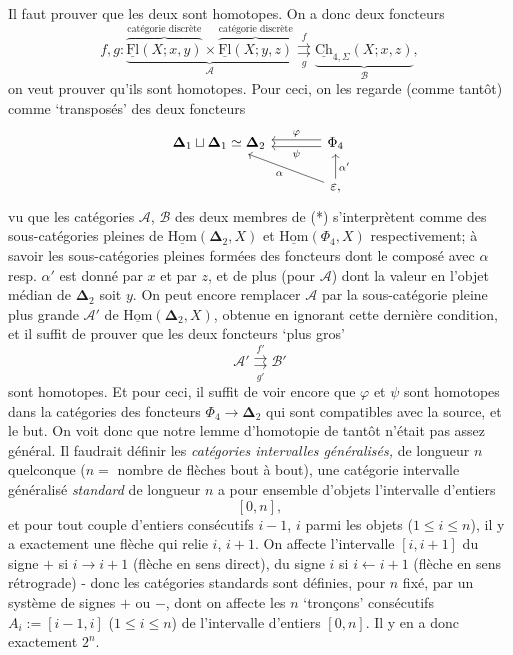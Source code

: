 \documentclass[11pt]{article}
\newcommand{\printedpage}[1]{\marginpar{\footnotesize p.~#1}}
\newcommand{\msp}[1]{\marginpar{\footnotesize [#1]}}
\newcommand{\uHom}{\underline{\mathrm{Hom}}}
\newcommand{\bDelta}{\boldsymbol{\Delta}}
\newcommand{\uCh}{\underline{\mathrm{Ch}}}
\newcommand{\uFl}{\underline{\mathrm{Fl}}}
\begin{document}
\msp{page 24}Il faut prouver que les deux sont homotopes. On a donc deux foncteurs
\[
f,g : \underbrace{\overbrace{\uFl(X;x,y)}^{\text{catégorie discrète}} \times \overbrace{\uFl(X;y,z)}^{\text{catégorie discrète}}}_{\mathcal{A}} \underset{g}{\overset{f}{\rightrightarrows}} \underbrace{\uCh_{4,\Sigma}(X;x,z)}_{\mathcal{B}}, \tag*{$(\ast)$}
\]
on veut prouver qu'ils sont homotopes. Pour ceci, on les regarde (comme tantôt) comme `transposés' des deux foncteurs
\[
\begin{tikzcd}[column sep=large]
\bDelta_1 \sqcup \bDelta_1 \simeq \bDelta_2 & \Phi_4 \arrow[l, shift right, "\varphi"'] \arrow[l, shift left, "\psi"] \\
& \varepsilon, \arrow[ul, "\alpha"] \arrow[u, "\alpha'"']
\end{tikzcd}
\]
vu que les catégories $\mathcal{A}$, $\mathcal{B}$ des deux membres de (*) s'interprètent comme des sous-catégories pleines de $\uHom(\bDelta_2, X)$ et $\uHom(\Phi_4, X)$ respectivement; à savoir les sous-catégories pleines formées des foncteurs dont le composé avec $\alpha$ resp. $\alpha'$ est donné par $x$ et par $z$, et de plus (pour $\mathcal{A}$) dont la valeur en l'objet médian de $\bDelta_2$ soit $y$. On peut encore remplacer $\mathcal{A}$ par la sous-catégorie pleine plus grande $\mathcal{A}'$ de $\uHom(\bDelta_2, X)$, obtenue en ignorant cette dernière condition, et il suffit de prouver que les deux foncteurs `plus gros'
\printedpage{16}
\[
\mathcal{A}' \underset{g'}{\overset{f'}{\rightrightarrows}} \mathcal{B}'
\]
sont homotopes. Et pour ceci, il suffit de
\msp{page 25}voir encore que $\varphi$ et $\psi$ sont homotopes dans la catégories des foncteurs $\Phi_4 \longrightarrow \bDelta_2$ qui sont compatibles avec la source, et le but. On voit donc que notre lemme d'homotopie de tantôt n'était pas assez général. Il faudrait définir les \textit{catégories intervalles généralisés,} de longueur $n$ quelconque ($n =$ nombre de flèches bout à bout), une catégorie intervalle généralisé \textit{standard} de longueur $n$ a pour ensemble d'objets l'intervalle d'entiers %
\[
[0,n],
\]
et pour tout couple d'entiers consécutifs $i-1$, $i$ parmi les objets ($1 \leq i \leq n$), il y a exactement une flèche qui relie $i$, $i+1$. On affecte l'intervalle $[i,i+1]$ du signe $+$ si $i \longrightarrow i+1$ (flèche en sens direct), du signe $i$ si $i \longleftarrow i+1$ (flèche en sens rétrograde) - donc les catégories standards sont définies, pour $n$ fixé, par un système de signes $+$ ou $-$, dont on affecte les $n$ `tronçons' consécutifs $A_i := [i-1,i]$ ($1 \leq i \leq n$) de l'intervalle d'entiers $[0,n]$. Il y en a donc exactement $2^n$.
\end{document}
